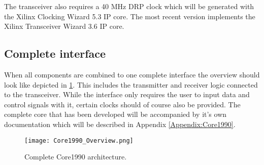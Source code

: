 	The transceiver also requires a 40 MHz DRP clock which will be generated with the Xilinx Clocking Wizard 5.3 IP core. The most recent version implements the Xilinx Transceiver Wizard 3.6 IP core.

\subsection{Complete interface}
	When all components are combined to one complete interface the overview should look like depicted in \ref{Fig:Core1990}. This includes the transmitter and receiver logic connected to the transceiver. While the interface only requires the user to input data and control signals with it, certain clocks should of course also be provided. The complete core that has been developed will be accompanied by it's own documentation which will be described in Appendix \ref{Appendix:Core1990}.
	
	\begin{figure}[H]
		\centering
		\texttt{[image: Core1990\_Overview.png]}	
		\caption{Complete Core1990 architecture.}
		\label{Fig:Core1990}
	\end{figure}

\newpage